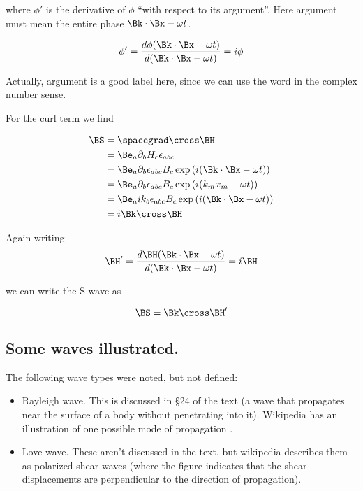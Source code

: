 where $\phi'$ is the derivative of $\phi$ ``with respect to its argument''.   Here argument must mean the entire phase $\Bk \cdot \Bx - \omega t$.

\begin{equation}\label{eqn:continuumL8:170}
\phi' = \frac{ d\phi( \Bk \cdot \Bx - \omega t )}{ d(\Bk \cdot \Bx - \omega t) } = i \phi
\end{equation}

Actually, argument is a good label here, since we can use the word in the complex number sense.

For the curl term we find

\begin{align*}
\BS
&= \spacegrad \cross \BH \\
&= \Be_a \partial_b H_c \epsilon_{a b c} \\
&= \Be_a \partial_b \epsilon_{a b c} B_c \exp\left( i ( \Bk \cdot \Bx - \omega t) \right) \\
&= \Be_a \partial_b \epsilon_{a b c} B_c \exp\left( i ( k_m x_m - \omega t) \right) \\
&= \Be_a i k_b \epsilon_{a b c} B_c \exp\left( i ( \Bk \cdot \Bx - \omega t) \right) \\
&= i \Bk \cross \BH
\end{align*}

Again writing
\begin{equation}\label{eqn:continuumL8:190}
\BH' = \frac{ d\BH( \Bk \cdot \Bx - \omega t )}{ d(\Bk \cdot \Bx - \omega t) } = i \BH
\end{equation}

we can write the S wave as

\begin{equation}\label{eqn:continuumL8:210}
\BS = \Bk \cross \BH'
\end{equation}

\subsection{Some waves illustrated.}

The following wave types were noted, but not defined:

\begin{itemize}
\item Rayleigh wave.  This is discussed in \S 24 of the text (a wave that propagates near the surface of a body without penetrating into it).  Wikipedia has an illustration of one possible mode of propagation \cite{wiki:rayleighwave}.
\item Love wave.  These aren't discussed in the text, but wikipedia \cite{wiki:lovewave} describes them as polarized shear waves (where the figure indicates that the shear displacements are perpendicular to the direction of propagation).
\end{itemize}

